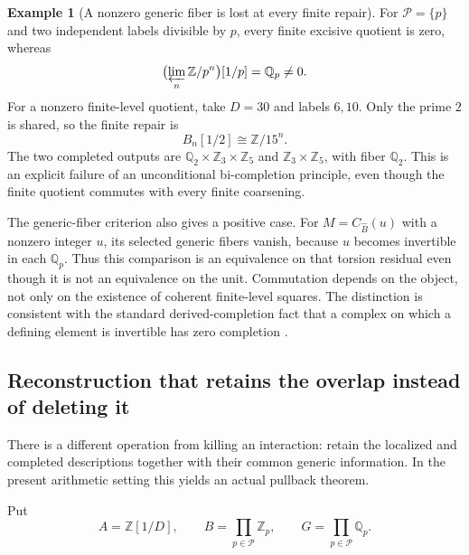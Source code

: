 \documentclass[11pt]{article}
\theoremstyle{definition}
\newtheorem{example}[theorem]{Example}
\theoremstyle{remark}
\begin{document}
\begin{example}[A nonzero generic fiber is lost at every finite repair]\label{ex:repair-before-completion}
For $\mathcal P=\{p\}$ and two independent labels divisible by $p$, every finite excisive quotient is zero, whereas
\[
 \bigl(\varprojlim_n\mathbb Z/p^n\bigr)[1/p]=\mathbb Q_p\ne0.
\]
For a nonzero finite-level quotient, take $D=30$ and labels $6,10$. Only the prime $2$ is shared, so the finite repair is
\[
 B_n[1/2]\cong\mathbb Z/15^n.
\]
The two completed outputs are $\mathbb Q_2\times\mathbb Z_3\times\mathbb Z_5$ and $\mathbb Z_3\times\mathbb Z_5$, with fiber $\mathbb Q_2$. This is an explicit failure of an unconditional bi-completion principle, even though the finite quotient commutes with every finite coarsening.
\end{example}

The generic-fiber criterion also gives a positive case. For $M=C_{\widehat B}(u)$ with a nonzero integer $u$, its selected generic fibers vanish, because $u$ becomes invertible in each $\mathbb Q_p$. Thus this comparison is an equivalence on that torsion residual even though it is not an equivalence on the unit. Commutation depends on the object, not only on the existence of coherent finite-level squares. The distinction is consistent with the standard derived-completion fact that a complex on which a defining element is invertible has zero completion \cite{StacksDerivedCompletion}.

\subsection{Reconstruction that retains the overlap instead of deleting it}

There is a different operation from killing an interaction: retain the localized and completed descriptions together with their common generic information. In the present arithmetic setting this yields an actual pullback theorem.

Put
\[
 A=\mathbb Z[1/D],\qquad B=\prod_{p\in\mathcal P}\mathbb Z_p,
 \qquad G=\prod_{p\in\mathcal P}\mathbb Q_p.
\]
\end{document}
